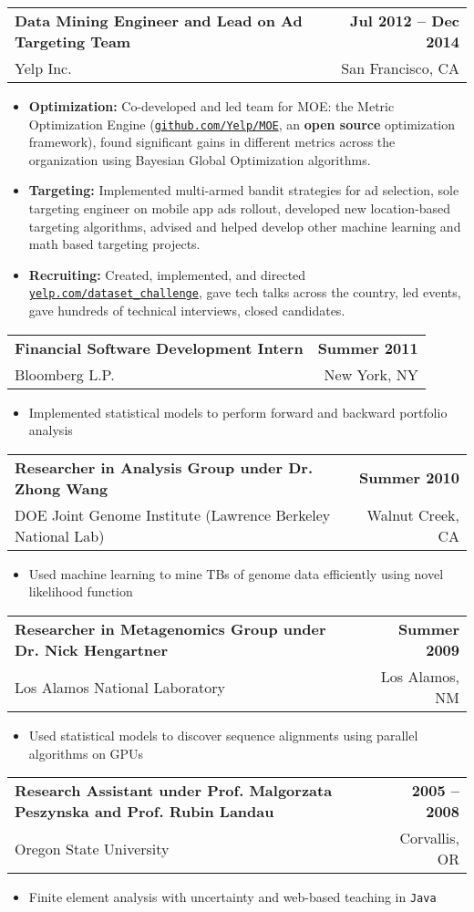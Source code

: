 \documentclass[letterpaper, 11pt]{article}
\makeatletter
\newcommand{\entry}[4]{%
  \begin{tabularx}{\linewidth}{@{}Xr@{}}
    \textbf{#2} & \textbf{#1} \\
    #3          & #4          \\
  \end{tabularx}
}
\newcommand{\website}[1]{\href{http://#1}{\texttt{#1}}}
\makeatother
\begin{document}
  \entry{Jul 2012 -- Dec 2014}{Data Mining Engineer and Lead on Ad Targeting Team}{Yelp Inc.}{San Francisco, CA}
  \begin{itemize}
    \item{{\bf Optimization:} Co-developed and led team for MOE: the Metric Optimization Engine (\website{github.com/Yelp/MOE}, an \textbf{open source} optimization framework), found significant gains in different metrics across the organization using Bayesian Global Optimization algorithms.}
    \item{{\bf Targeting:} Implemented multi-armed bandit strategies for ad selection, sole targeting engineer on mobile app ads rollout, developed new location-based targeting algorithms, advised and helped develop other machine learning and math based targeting projects.}
    \item{{\bf Recruiting:} Created, implemented, and directed \website{yelp.com/dataset\_challenge}, gave tech talks across the country, led events, gave hundreds of technical interviews, closed candidates.}
  \end{itemize}

  \entry{Summer 2011}{Financial Software Development Intern}{Bloomberg L.P.}{New York, NY}
  \begin{itemize}
    \item{Implemented statistical models to perform forward and backward portfolio analysis}
  \end{itemize}

  \entry{Summer 2010}{Researcher in Analysis Group under Dr. Zhong Wang}{DOE Joint Genome Institute (Lawrence Berkeley National Lab)}{Walnut Creek, CA}
  \begin{itemize}
    \item{Used machine learning to mine TBs of genome data efficiently using novel likelihood function}
  \end{itemize}

  \entry{Summer 2009}{Researcher in Metagenomics Group under Dr. Nick Hengartner}{Los Alamos National Laboratory}{Los Alamos, NM}
  \begin{itemize}
    \item{Used statistical models to discover sequence alignments using parallel algorithms on GPUs}
  \end{itemize}

  \entry{2005 -- 2008}{Research Assistant under Prof. Malgorzata Peszynska and Prof. Rubin Landau}{Oregon State University}{Corvallis, OR}
  \begin{itemize}
    \item{Finite element analysis with uncertainty and web-based teaching in \texttt{Java}}
  \end{itemize}
\end{document}
